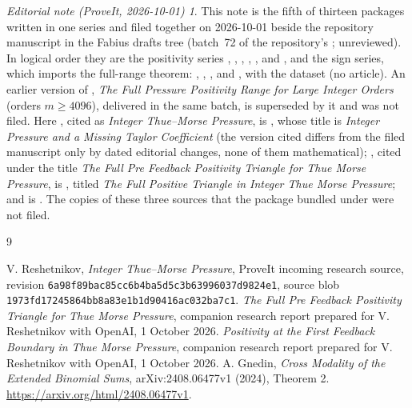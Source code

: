 \documentclass[11pt,a4paper]{article}
\theoremstyle{remark}\newtheorem*{ednote}{Editorial note (ProveIt, 2026-10-01)}
\begin{document}
\begin{ednote}
This note is the fifth of thirteen packages written in one series and filed together on 2026-10-01 beside the repository manuscript  in the Fabius drafts tree (batch~72 of the repository's ; unreviewed). In logical order they are the positivity series , , , , ,  and , and the sign series, which imports the full-range theorem: , , ,  and , with the dataset  (no article). An earlier version of , \emph{The Full Pressure Positivity Range for Large Integer Orders} (orders $m\ge4096$), delivered in the same batch, is superseded by it and was not filed.
Here \cite{integer}, cited as \emph{Integer Thue--Morse Pressure}, is , whose title
is \emph{Integer Pressure and a Missing Taylor Coefficient} (the version cited differs from the filed manuscript only by dated editorial changes, none of them mathematical); \cite{triangle},
cited under the title \emph{The Full Pre Feedback Positivity Triangle for Thue Morse Pressure},
is , titled \emph{The Full Positive Triangle in Integer Thue Morse
Pressure}; and \cite{boundary} is . The copies of these three
sources that the package bundled under  were not filed.
\end{ednote}
\begin{thebibliography}{9}\small\raggedright
{} V. Reshetnikov, \emph{Integer Thue--Morse Pressure}, ProveIt incoming research source, revision \texttt{6a98f89bac85cc6b4ba5d5c3b63996037d9824e1}, source blob \texttt{1973fd17245864bb8a83e1b1d90416ac032ba7c1}.
 \emph{The Full Pre Feedback Positivity Triangle for Thue Morse Pressure}, companion research report prepared for V. Reshetnikov with OpenAI, 1 October 2026.
 \emph{Positivity at the First Feedback Boundary in Thue Morse Pressure}, companion research report prepared for V. Reshetnikov with OpenAI, 1 October 2026.
 A. Gnedin, \emph{Cross Modality of the Extended Binomial Sums}, arXiv:2408.06477v1 (2024), Theorem 2. \url{https://arxiv.org/html/2408.06477v1}.
\end{thebibliography}
\end{document}
